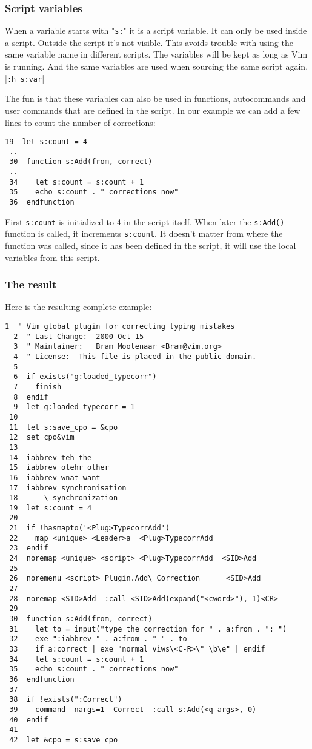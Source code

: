 \subsubsection{Script variables}
When a variable starts with "\verb!s:!" it is a script variable.
It can only be used inside a script.
Outside the script it's not visible.
This avoids trouble with using the same variable name in different scripts.
The variables will be kept as long as Vim is running.
And the same variables are used when sourcing the same script again. |\verb!:h s:var!|

The fun is that these variables can also be used in functions, autocommands and user commands that are defined in the script.
In our example we can add a few lines to count the number of corrections:

\begin{Verbatim}[samepage=true]
 19  let s:count = 4
 ..
 30  function s:Add(from, correct)
 ..
 34    let s:count = s:count + 1
 35    echo s:count . " corrections now"
 36  endfunction
\end{Verbatim}

First \verb!s:count! is initialized to 4 in the script itself.
When later the \verb!s:Add()! function is called, it increments \verb!s:count!.
It doesn't matter from where the function was called, since it has been defined in the script, it will use the local variables from this script.

\subsubsection{The result}
Here is the resulting complete example:

\begin{Verbatim}[samepage=true]
  1  " Vim global plugin for correcting typing mistakes
  2  " Last Change:  2000 Oct 15
  3  " Maintainer:   Bram Moolenaar <Bram@vim.org>
  4  " License:  This file is placed in the public domain.
  5
  6  if exists("g:loaded_typecorr")
  7    finish
  8  endif
  9  let g:loaded_typecorr = 1
 10
 11  let s:save_cpo = &cpo
 12  set cpo&vim
 13
 14  iabbrev teh the
 15  iabbrev otehr other
 16  iabbrev wnat want
 17  iabbrev synchronisation
 18      \ synchronization
 19  let s:count = 4
 20
 21  if !hasmapto('<Plug>TypecorrAdd')
 22    map <unique> <Leader>a  <Plug>TypecorrAdd
 23  endif
 24  noremap <unique> <script> <Plug>TypecorrAdd  <SID>Add
 25
 26  noremenu <script> Plugin.Add\ Correction      <SID>Add
 27
 28  noremap <SID>Add  :call <SID>Add(expand("<cword>"), 1)<CR>
 29
 30  function s:Add(from, correct)
 31    let to = input("type the correction for " . a:from . ": ")
 32    exe ":iabbrev " . a:from . " " . to
 33    if a:correct | exe "normal viws\<C-R>\" \b\e" | endif
 34    let s:count = s:count + 1
 35    echo s:count . " corrections now"
 36  endfunction
 37
 38  if !exists(":Correct")
 39    command -nargs=1  Correct  :call s:Add(<q-args>, 0)
 40  endif
 41
 42  let &cpo = s:save_cpo
\end{Verbatim}

